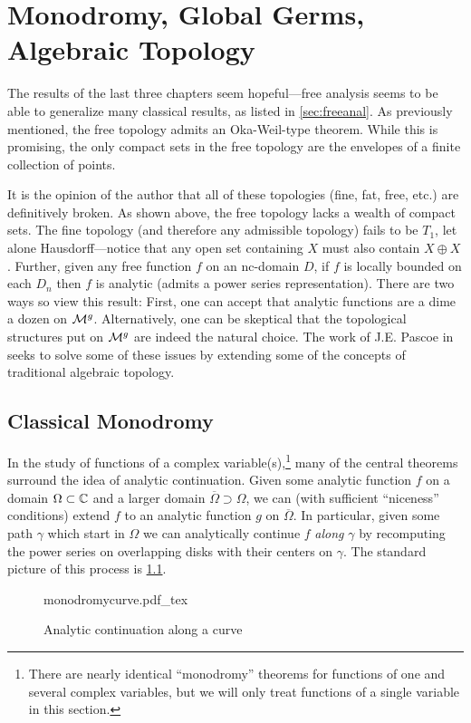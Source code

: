 \chapter{Monodromy, Global Germs, Algebraic Topology}\label{ch:monodromy}

The results of the last three chapters seem hopeful---free analysis seems to be
able to generalize many classical results, as listed in \cref{sec:freeanal}. As
previously mentioned, the free topology admits an Oka-Weil-type theorem.
While this is promising, the only compact sets in the free topology are the
envelopes of a finite collection of points.

It is the opinion of the author that all of these topologies (fine, fat, free,
etc.) are definitively
broken. As shown above, the free topology lacks a wealth of compact sets.
The fine topology (and therefore any admissible topology)
fails to be \(T_1\), let alone Hausdorff---notice that any open set containing
\(X\) must also contain \(X\oplus X\). Further, given any free function \(f\)
on an nc-domain \(D\), if \(f\) is locally bounded on each \(D_n\) then \(f\)
is analytic (admits a power series representation). There are two ways so view
this result: First, one can accept that analytic functions are a dime a dozen on
\(\mathcal{M}^{g} \). Alternatively, one can be skeptical that the topological
structures put on \(\mathcal{M}^{g} \) are indeed the natural choice. The work of J.E.
Pascoe in \cite{pascoeFreeNoncommutativePrincipal2020} seeks to solve some of
these issues by extending some of the concepts of traditional algebraic
topology.

\section{Classical Monodromy}%
\label{sec:classmono}

In the study of functions of a complex variable(s),\footnote{There are nearly
  identical ``monodromy'' theorems for functions of one and several complex
  variables, but we will only treat functions of a single variable in this section.}
many of the central
theorems surround the idea of analytic continuation. Given some analytic
function \(f\) on a domain \(\Omega \subset\mathbb{C} \) and a larger domain
\(\overline{\Omega} \supset \Omega\), we can (with sufficient
``niceness'' conditions) extend \(f\) to an analytic function \(g\) on
\(\overline{\Omega}\). In particular, given some path \(\gamma\) which start in
\(\Omega\) we can analytically continue \(f\) \emph{along} \(\gamma\) by recomputing the
power series on overlapping disks with their centers on \(\gamma\). The
standard picture of this process is \cref{fig:monocurve}.
\begin{figure}[h!]%
\centering
  \def\svgwidth{0.8\columnwidth}
  {monodromycurve.pdf_tex}
\caption{Analytic continuation along a curve}
\label{fig:monocurve}
\end{figure}

